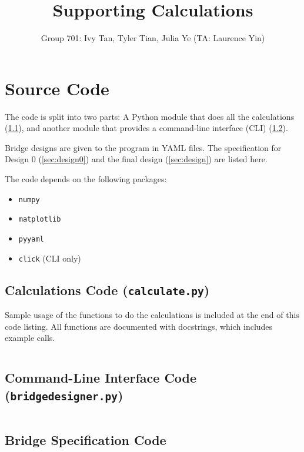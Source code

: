 \documentclass{article}
\title{Supporting Calculations}
\author{Group 701: Ivy Tan, Tyler Tian, Julia Ye (TA: Laurence Yin)}
\begin{document}
\maketitle
\sloppy

\section{Source Code}

The code is split into two parts: A Python module that does all the calculations (\ref{sec:calc}), and another module
that provides a command-line interface (CLI) (\ref{sec:cli}).

Bridge designs are given to the program in YAML files. The specification for Design 0 (\ref{sec:design0}) and the final
design (\ref{sec:design}) are listed here.

The code depends on the following packages:
\begin{itemize}
    \setlength\itemsep{0em}
    \item \texttt{numpy}
    \item \texttt{matplotlib}
    \item \texttt{pyyaml}
    \item \texttt{click} (CLI only)
\end{itemize}

\subsection{Calculations Code (\texttt{calculate.py})}
\label{sec:calc}

Sample usage of the functions to do the calculations is included at the end of this code listing. All functions are
documented with docstrings, which includes example calls.

\inputminted[linenos, breaklines, fontsize=\small]{python}{../../calculate.py}
\pagebreak

\subsection{Command-Line Interface Code (\texttt{bridgedesigner.py})}
\label{sec:cli}

\inputminted[linenos, breaklines, fontsize=\small]{python}{../../bridgedesigner.py}
\pagebreak

\subsection{Bridge Specification Code}
\end{document}
